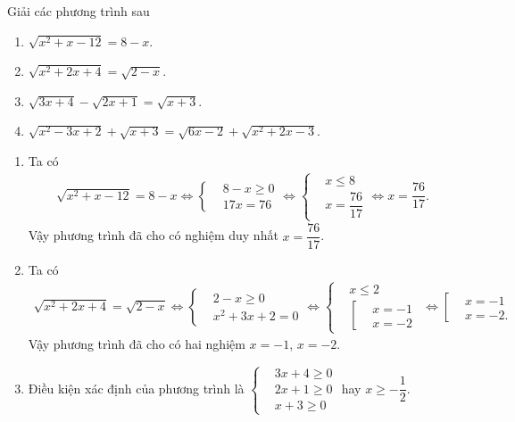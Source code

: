\begin{bt}
	Giải các phương trình sau
	\begin{enumerate}
		\item $\sqrt{x^2+x-12}=8-x$.
		\item $\sqrt{x^2+2x+4}=\sqrt{2-x}$.
		\item $\sqrt{3x+4}-\sqrt{2x+1}=\sqrt{x+3}$.
		\item $\sqrt{x^2-3x+2}+\sqrt{x+3}=\sqrt{6x-2}+\sqrt{x^2+2x-3}$.
	\end{enumerate}
	\loigiai
	{
		\begin{enumerate}
			\item Ta có
			\begin{eqnarray*}
				\sqrt{x^2+x-12}=8-x \Leftrightarrow \left\{\begin{aligned}&8-x\geq 0\\&17x=76\end{aligned}\right. \Leftrightarrow\left\{\begin{aligned}&x\leq 8 \\&x=\dfrac{76}{17}\end{aligned}\right. \Leftrightarrow x=\dfrac{76}{17}.
			\end{eqnarray*}
			Vậy phương trình đã cho có nghiệm duy nhất $x=\dfrac{76}{17}$.
			\item Ta có
			\begin{eqnarray*}
				\sqrt{x^2+2x+4}=\sqrt{2-x} \Leftrightarrow \left\{\begin{aligned}&2-x\geq 0\\&x^2+3x+2=0\end{aligned}\right. \Leftrightarrow \left\{\begin{aligned}&x\leq 2 \\&\left[\begin{aligned}&x=-1\\&x=-2\end{aligned}\right.\end{aligned}\right. \Leftrightarrow \left[\begin{aligned}&x=-1 \\&x=-2.\end{aligned}\right.
			\end{eqnarray*}
			Vậy phương trình đã cho có hai nghiệm $x=-1$, $x=-2$.
			\item Điều kiện xác định của phương trình là $\left\{\begin{aligned}&3x+4\geq 0 \\&2x+1\geq 0 \\&x+3\geq 0\end{aligned}\right.$ hay $x\geq -\dfrac{1}{2}$.\\

\end{enumerate}}
\end{bt}
